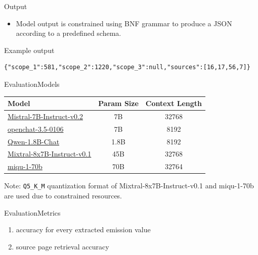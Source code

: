 \documentclass{beamer}
\begin{document}
\begin{frame}[fragile=singleslide]{Output}
\begin{itemize}
\item Model output is constrained using BNF grammar to produce a JSON according to a predefined schema.
\end{itemize}
\begin{block}{Example output}
\tiny
\begin{lstlisting}
{"scope_1":581,"scope_2":1220,"scope_3":null,"sources":[16,17,56,7]}
\end{lstlisting}
\end{block}
\end{frame}

\begin{frame}{Evaluation}{Models}
\begin{table}[]
	\begin{tabular}{|l|c|c|}
		\hline
		\textbf{Model} & \textbf{Param Size} & \textbf{Context Length} \\ \hline
		\href{https://huggingface.co/mistralai/Mistral-7B-Instruct-v0.2}{Mistral-7B-Instruct-v0.2} & 7B & 32768 \\ \hline
		\href{https://huggingface.co/openchat/openchat-3.5-0106}{openchat-3.5-0106} & 7B & 8192 \\ \hline
		\href{https://huggingface.co/Qwen/Qwen-1_8B-Chat}{Qwen-1.8B-Chat} & 1.8B & 8192 \\ \hline
		\href{https://huggingface.co/mistralai/Mixtral-8x7B-Instruct-v0.1}{Mixtral-8x7B-Instruct-v0.1} & 45B & 32768 \\ \hline
		\href{https://huggingface.co/miqudev/miqu-1-70b}{miqu-1-70b} & 70B & 32764 \\ \hline
	\end{tabular}
\end{table}
Note: \texttt{Q5\_K\_M} quantization format of Mixtral-8x7B-Instruct-v0.1 and miqu-1-70b are used due to constrained resources.
\end{frame}
\begin{frame}{Evaluation}{Metrics}
\begin{enumerate}
\item accuracy for every extracted emission value
\item source page retrieval accuracy
\end{enumerate}
\end{frame}
\end{document}
